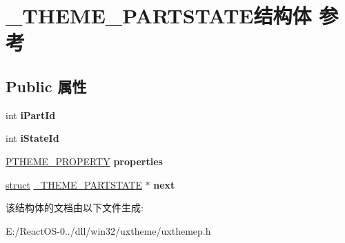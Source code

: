 \hypertarget{struct___t_h_e_m_e___p_a_r_t_s_t_a_t_e}{}\section{\+\_\+\+T\+H\+E\+M\+E\+\_\+\+P\+A\+R\+T\+S\+T\+A\+T\+E结构体 参考}
\label{struct___t_h_e_m_e___p_a_r_t_s_t_a_t_e}
\subsection*{Public 属性}
\begin{DoxyCompactItemize}
\item 
\mbox{\label{struct___t_h_e_m_e___p_a_r_t_s_t_a_t_e_a12a2606a1cc248de7a30d74184ec4657}} 
int {\bfseries i\+Part\+Id}
\item 
\mbox{\label{struct___t_h_e_m_e___p_a_r_t_s_t_a_t_e_ab2eaf8e8889a641c7b08278a6ba92aec}} 
int {\bfseries i\+State\+Id}
\item 
\mbox{\label{struct___t_h_e_m_e___p_a_r_t_s_t_a_t_e_ae0b5f9fed8f61e4c9b8628985027c272}} 
\hyperlink{struct___t_h_e_m_e___p_r_o_p_e_r_t_y}{P\+T\+H\+E\+M\+E\+\_\+\+P\+R\+O\+P\+E\+R\+TY} {\bfseries properties}
\item 
\mbox{\label{struct___t_h_e_m_e___p_a_r_t_s_t_a_t_e_ace834b4846dfb7a2d3d9eaa513fc3f78}} 
\hyperlink{interfacestruct}{struct} \hyperlink{struct___t_h_e_m_e___p_a_r_t_s_t_a_t_e}{\+\_\+\+T\+H\+E\+M\+E\+\_\+\+P\+A\+R\+T\+S\+T\+A\+TE} $\ast$ {\bfseries next}
\end{DoxyCompactItemize}


该结构体的文档由以下文件生成\+:\begin{DoxyCompactItemize}
\item 
E\+:/\+React\+O\+S-\/0../dll/win32/uxtheme/uxthemep.\+h\end{DoxyCompactItemize}
